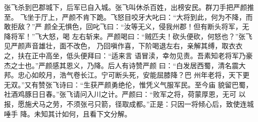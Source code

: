 张飞杀到巴郡城下，后军已自入城。张飞叫休杀百姓，出榜安民。群刀手把严颜推至。
飞坐于厅上，严颜不肯下跪。飞怒目咬牙大叱曰：“大将到此，何为不降，而敢拒敌？”严
颜全无惧色，回叱飞曰：“汝等无义，侵我州郡！但有断头将军，无降将军！”飞大怒，喝
左右斩来。严颜喝曰：“贼匹夫！砍头便砍，何怒也？”张飞见严颜声音雄壮，面不改色，
乃回嗔作喜，下阶喝退左右，亲解其缚，取衣衣之，扶在正中高坐，低头便拜曰：“适来言
语冒渎，幸勿见责。吾素知老将军乃豪杰之士也。”严颜感其恩义，乃降。后人有诗赞严颜
曰：“白发居西蜀，清名震大邦。忠心如皎月，浩气卷长江。宁可断头死，安能屈膝降？巴
州年老将，天下更无双。”又有赞张飞诗曰：“生获严颜勇绝伦，惟凭义气服军民。至今庙
貌留巴蜀，社酒鸡豚日日春。”张飞请问入川之计。严颜曰：“败军之将，荷蒙厚恩，无可
以报，愿施犬马之劳，不须张弓只箭，径取成都。”正是：只因一将倾心后，致使连城唾手
降。未知其计如何，且看下文分解。